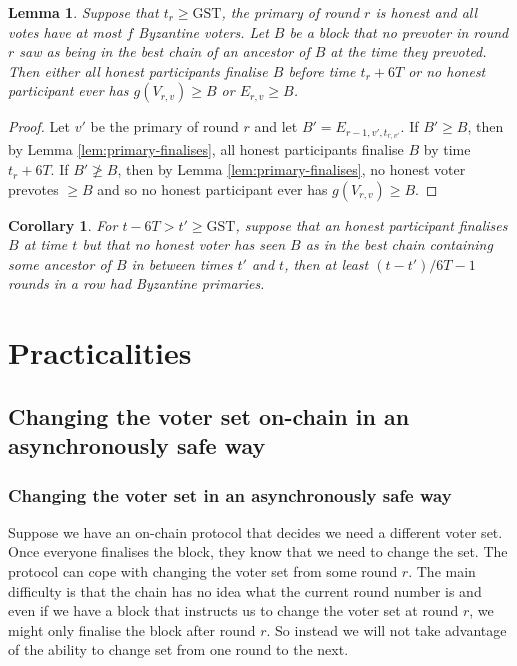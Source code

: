 \documentclass{article}
\newtheorem{lemma}[theorem]{Lemma}
\newtheorem{corollary}[theorem]{Corollary}
\def\GST{\mathrm{GST}}
\begin{document}
\begin{lemma} \label{lem:honest-recent-validity}
Suppose that $t_r \geq \GST$, the primary of round $r$ is honest and all votes have at most $f$ Byzantine voters.
Let $B$ be a block that no prevoter in round $r$ saw as being in the best chain of an ancestor of $B$ at the time they prevoted.
Then either all honest participants finalise $B$ before time $t_r+6T$ or no honest participant ever has $g(V_{r,v}) \geq B$ or $E_{r,v} \geq B$.
\end{lemma}

\begin{proof} Let $v'$ be the primary of round $r$ and let $B'=E_{r-1,v',t_{r,v'}}$. If $B' \geq B$, then by Lemma \ref{lem:primary-finalises}, all honest participants finalise $B$ by time $t_r+6T$. If $B' \not\geq B$, then by Lemma \ref{lem:primary-finalises}, no honest voter prevotes $\geq B$ and so no honest participant ever has $g(V_{r,v}) \geq B$.
\end{proof}


\begin{corollary} For $t - 6T > t' \geq \GST$, suppose that an honest participant finalises $B$ at time $t$ but that no honest voter has seen $B$ as in the best chain containing some ancestor of $B$ in between times $t'$ and $t$, then at least $(t-t')/6T - 1$ rounds in a row had Byzantine primaries. \end{corollary}




\section{Practicalities}

\subsection{Changing the voter set on-chain in an asynchronously safe way}

\subsubsection{Changing the voter set in an asynchronously safe way}

Suppose we have an on-chain protocol that decides we need a different voter set. Once everyone finalises the block, they know that we need to change the set. The protocol can cope with changing the voter set from some round $r$.
The main difficulty is that the chain has no idea what the current round number is and even if we have a block that instructs us to change the voter set at round $r$, we might only finalise the block after round $r$.
So instead we will not take advantage of the ability to change set from one round to the next. 
\end{document}
